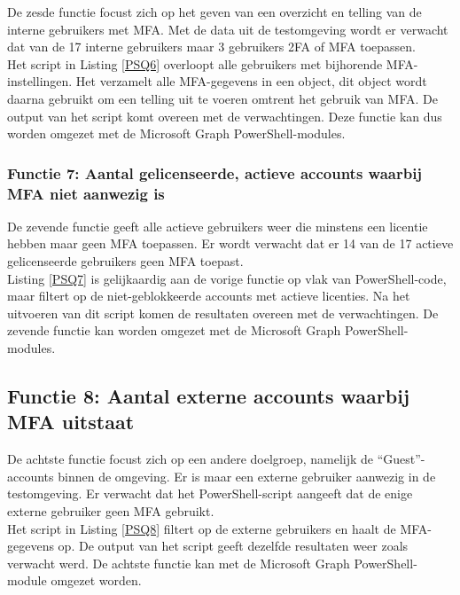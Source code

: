 De zesde functie focust zich op het geven van een overzicht en telling van de interne gebruikers met \ac{MFA}. Met de data uit de testomgeving wordt er verwacht dat van de 17 interne gebruikers maar 3 gebruikers \ac{2FA} of \ac{MFA} toepassen. \\

Het script in Listing \ref{PSQ6} overloopt alle gebruikers met bijhorende \ac{MFA}-instellingen. Het verzamelt alle \ac{MFA}-gegevens in een object, dit object wordt daarna gebruikt om een telling uit te voeren omtrent het gebruik van \ac{MFA}. De output van het script komt overeen met de verwachtingen. Deze functie kan dus worden omgezet met de Microsoft Graph PowerShell-modules. 

\subsubsection{Functie 7: Aantal gelicenseerde, actieve accounts waarbij MFA niet aanwezig is}

De zevende functie geeft alle actieve gebruikers weer die minstens een licentie hebben maar geen \ac{MFA} toepassen. Er wordt verwacht dat er 14 van de 17 actieve gelicenseerde gebruikers geen \ac{MFA} toepast. \\

Listing \ref{PSQ7} is gelijkaardig aan de vorige functie op vlak van PowerShell-code, maar filtert op de niet-geblokkeerde accounts met actieve licenties. Na het uitvoeren van dit script komen de resultaten overeen met de verwachtingen. De zevende functie kan worden omgezet met de Microsoft Graph PowerShell-modules.

\subsection{Functie 8: Aantal externe accounts waarbij MFA uitstaat}

De achtste functie focust zich op een andere doelgroep, namelijk de “Guest”-accounts binnen de omgeving. Er is maar een externe gebruiker aanwezig in de testomgeving. Er verwacht dat het PowerShell-script aangeeft dat de enige externe gebruiker geen \ac{MFA} gebruikt. \\

Het script in Listing \ref{PSQ8} filtert op de externe gebruikers en haalt de \ac{MFA}-gegevens op. De output van het script geeft dezelfde resultaten weer zoals verwacht werd. De achtste functie kan met de Microsoft Graph PowerShell-module omgezet worden.

